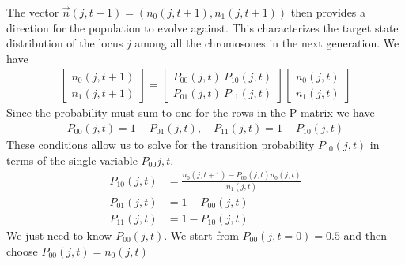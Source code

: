 The vector $\vec{n}(j,t+1)=(n_0(j, t+1), n_1(j, t+1))$ then provides a direction for the population to evolve against. This characterizes the target state distribution of the locus $j$ among all the chromosones in the next generation. We have
\begin{align*}
  \begin{bmatrix}
    n_0(j, t+1) \\
    n_1(j, t+1)
  \end{bmatrix}
  = 
  \begin{bmatrix}
    P_{00}(j,t) \ P_{10}(j,t) \\
    P_{01}(j,t) \ P_{11}(j,t)
  \end{bmatrix}
  \begin{bmatrix}
    n_0(j, t) \\
    n_1(j, t)
  \end{bmatrix}
\end{align*}
Since the probability must sum to one for the rows in the P-matrix we have 
\begin{align*}
  P_{00}(j, t) = 1 - P_{01}(j, t), \quad P_{11}(j, t) = 1 - P_{10}(j, t)
\end{align*}
These conditions allow us to solve for the transition probability $P_{10}(j,t)$ in terms of the single variable $P_{00}{j,t}$.
\begin{align*}
  P_{10}(j,t) &= \frac{n_0(j, t+1) - P_{00}(j,t)n_0(j, t)}{n_1(j,t)} \\
  P_{01}(j,t) &= 1 - P_{00}(j,t) \\
  P_{11}(j,t) &= 1 - P_{10}(j,t)
\end{align*}
We just need to know $P_{00}(j,t)$. We start from $P_{00}(j, t = 0) = 0.5$ and then choose $P_{00}(j,t) = n_0(j,t)$




